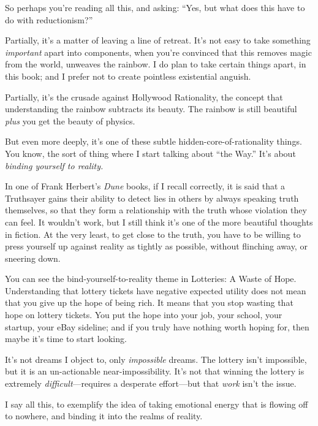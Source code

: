 \myendsectiontext


{
 So perhaps you're reading all this, and asking:
``Yes, but what does this have to do with
reductionism?'' }

{
 Partially, it's a matter of leaving a line of
retreat. It's not easy to take something
\textit{important} apart into components, when you're
convinced that this removes magic from the world, unweaves the rainbow.
I do plan to take certain things apart, in this book; and I prefer not
to create pointless existential anguish.}

{
 Partially, it's the crusade against Hollywood
Rationality, the concept that understanding the rainbow subtracts its
beauty. The rainbow is still beautiful \textit{plus} you get the beauty
of physics.}

{
 But even more deeply, it's one of these subtle
hidden-core-of-rationality things. You know, the sort of thing where I
start talking about ``the Way.''
It's about \textit{binding yourself to reality.}}

{
 In one of Frank Herbert's \textit{Dune} books, if
I recall correctly, it is said that a Truthsayer gains their ability to
detect lies in others by always speaking truth themselves, so that they
form a relationship with the truth whose violation they can feel. It
wouldn't work, but I still think it's
one of the more beautiful thoughts in fiction. At the very least, to
get close to the truth, you have to be willing to press yourself up
against reality as tightly as possible, without flinching away, or
sneering down.}

{
 You can see the bind-yourself-to-reality theme in Lotteries: A
Waste of Hope. Understanding that lottery tickets have negative
expected utility does not mean that you give up the hope of being rich.
It means that you stop wasting that hope on lottery tickets. You put
the hope into your job, your school, your startup, your eBay sideline;
and if you truly have nothing worth hoping for, then maybe
it's time to start looking.}

{
 It's not dreams I object to, only
\textit{impossible} dreams. The lottery isn't
impossible, but it is an un-actionable near-impossibility.
It's not that winning the lottery is extremely
\textit{difficult}{}---requires a desperate effort---but that
\textit{work} isn't the issue.}

{
 I say all this, to exemplify the idea of taking emotional energy
that is flowing off to nowhere, and binding it into the realms of
reality.}

